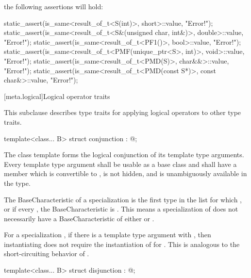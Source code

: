 the following assertions will hold:

\begin{codeblock}
static_assert(is_same<result_of_t<S(int)>, short>::value, "Error!");
static_assert(is_same<result_of_t<S&(unsigned char, int&)>, double>::value, "Error!");
static_assert(is_same<result_of_t<PF1()>, bool>::value, "Error!");
static_assert(is_same<result_of_t<PMF(unique_ptr<S>, int)>, void>::value, "Error!");
static_assert(is_same<result_of_t<PMD(S)>, char&&>::value, "Error!");
static_assert(is_same<result_of_t<PMD(const S*)>, const char&>::value, "Error!");
\end{codeblock}
\exitexample

[meta.logical]{Logical operator traits}

\pnum
This subclause describes type traits for applying logical operators
to other type traits.

%
\begin{itemdecl}
template<class... B> struct conjunction : @\seebelow@ { };
\end{itemdecl}

\begin{itemdescr}
\pnum
The class template 
forms the logical conjunction of its template type arguments.
Every template type argument
shall be usable as a base class and
shall have a member  which
is convertible to ,
is not hidden, and
is unambiguously available in the type.

\pnum
The BaseCharacteristic of a specialization 
is the first type  in the list 
for which , or
if every , the BaseCharacteristic is .
\enternote This means a specialization of 
does not necessarily have a BaseCharacteristic
of either  or .
\exitnote

\pnum
For a specialization ,
if there is a template type argument  with ,
then instantiating 
does not require the instantiation of  for .
\enternote This is analogous to the short-circuiting behavior of \tcode{\&\&}.
\exitnote
\end{itemdescr}

%
\begin{itemdecl}
template<class... B> struct disjunction : @\seebelow@ { };
\end{itemdecl}

